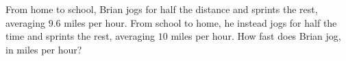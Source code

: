 From home to school, Brian jogs for half the distance and sprints the rest, averaging $9.6$ miles per hour. From school to home, he instead jogs for half the time and sprints the rest, averaging $10$ miles per hour. How fast does Brian jog, in miles per hour?
